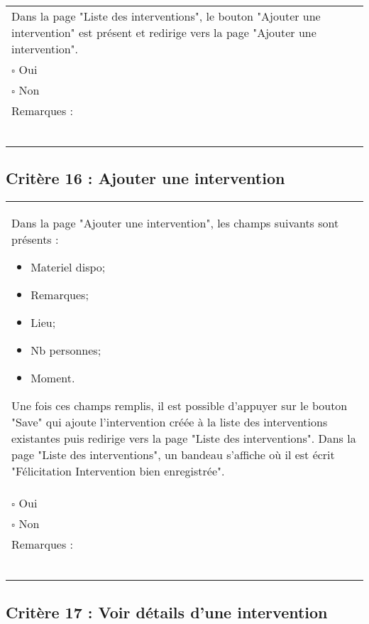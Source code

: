 	\begin{center}
    	 		\begin{tabular}[h]{|p{}|}
			\hline
				Dans la page "Liste des interventions", le bouton "Ajouter une intervention" est présent et redirige vers la page "Ajouter une intervention". \\
				$\square$ Oui  \\ $\square$ Non \\\hline Remarques : \\ ~\\
			 \\\hline
     		\end{tabular}
  		\end{center}	
  		
  		
  	\subsection*{Critère 16 : Ajouter une intervention}
	
	\begin{center}
    	 		\begin{tabular}[h]{|p{}|}
			\hline
				Dans la page "Ajouter une intervention", les champs suivants sont présents : 
				\begin{itemize}
					\item Materiel dispo;
					\item Remarques;
					\item Lieu;
					\item Nb personnes;
					\item Moment.
				\end{itemize}
				Une fois ces champs remplis, il est possible d'appuyer sur le bouton "Save" qui ajoute l'intervention créée à la liste des interventions existantes puis redirige vers la page "Liste des interventions". Dans la page "Liste des interventions", un bandeau s'affiche où il est écrit "Félicitation Intervention bien enregistrée".\\
				$\square$ Oui  \\ $\square$ Non \\\hline Remarques : \\ ~\\
			 \\\hline
     		\end{tabular}
  		\end{center}	
  		
  		
  		\subsection*{Critère 17 : Voir détails d'une intervention}
	
